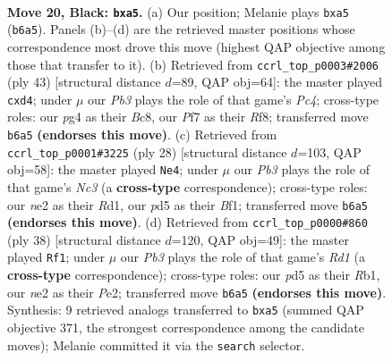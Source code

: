 \documentclass[11pt]{article}
\begin{document}
\clearpage

\begin{figure}[p]\centering
\begin{subfigure}{0.46\textwidth}\centering
\resizebox{\linewidth}{!}{%
\newchessgame
\chessboard[
  setfen={rn2r3/p2nqpkP/1p1p1b2/P1pP2p1/4P1P1/1PNQ4/4N3/R1B1K2R b KQ - 0 20},
  showmover=false,
  pgfstyle=straightmove, color=movearrow, markmove={b6-a5}
]}
\caption{}
\end{subfigure}\hfill
\begin{subfigure}{0.46\textwidth}\centering
\resizebox{\linewidth}{!}{%
\newchessgame
\chessboard[
  setfen={2b2r1k/3nnqp1/1p1b3p/2pp4/P2Pp3/2P4P/1P2QPPN/R1B1RN1K b - - 1 22},
  showmover=false,
  pgfstyle=straightmove, color=movearrow, markmove={c5-d4}
]}
\caption{}
\end{subfigure}
\\[4pt]
\begin{subfigure}{0.46\textwidth}\centering
\resizebox{\linewidth}{!}{%
\newchessgame
\chessboard[
  setfen={r1b1k2r/1p3ppp/p2q1n2/b2np3/8/2N2PB1/PPPQN1PP/1K1R1B1R w kq - 0 15},
  showmover=false,
  pgfstyle=straightmove, color=movearrow, markmove={c3-e4}
]}
\caption{}
\end{subfigure}\hfill
\begin{subfigure}{0.46\textwidth}\centering
\resizebox{\linewidth}{!}{%
\newchessgame
\chessboard[
  setfen={2r3k1/2qnpp2/rp3npb/7p/bBP5/P4NP1/3NPPBP/1RQR2K1 w - - 11 20},
  showmover=false,
  pgfstyle=straightmove, color=movearrow, markmove={d1-f1}
]}
\caption{}
\end{subfigure}
\caption{\textbf{Move 20, Black: \texttt{bxa5}.} (a) Our position; Melanie plays \texttt{bxa5} (\texttt{b6a5}). Panels (b)--(d) are the retrieved master positions whose correspondence most drove this move (highest QAP objective among those that transfer to it). (b) Retrieved from \texttt{ccrl\_top\_p0003\#2006} (ply 43) [structural distance $d$=89, QAP obj=64]: the master played \texttt{cxd4}; under $\mu$ our \emph{Pb3} plays the role of that game's \emph{Pc4}; cross-type roles: our \emph{p}g4 as their \emph{B}c8, our \emph{P}f7 as their \emph{R}f8; transferred move \texttt{b6a5} \textbf{(endorses this move)}. (c) Retrieved from \texttt{ccrl\_top\_p0001\#3225} (ply 28) [structural distance $d$=103, QAP obj=58]: the master played \texttt{Ne4}; under $\mu$ our \emph{Pb3} plays the role of that game's \emph{Nc3} (a \textbf{cross-type} correspondence); cross-type roles: our \emph{n}e2 as their \emph{R}d1, our \emph{p}d5 as their \emph{B}f1; transferred move \texttt{b6a5} \textbf{(endorses this move)}. (d) Retrieved from \texttt{ccrl\_top\_p0000\#860} (ply 38) [structural distance $d$=120, QAP obj=49]: the master played \texttt{Rf1}; under $\mu$ our \emph{Pb3} plays the role of that game's \emph{Rd1} (a \textbf{cross-type} correspondence); cross-type roles: our \emph{p}d5 as their \emph{R}b1, our \emph{n}e2 as their \emph{P}e2; transferred move \texttt{b6a5} \textbf{(endorses this move)}. Synthesis: 9 retrieved analogs transferred to \texttt{bxa5} (summed QAP objective 371, the strongest correspondence among the candidate moves); Melanie committed it via the \texttt{search} selector.}
\label{fig:thought-m39}
\end{figure}
\end{document}
